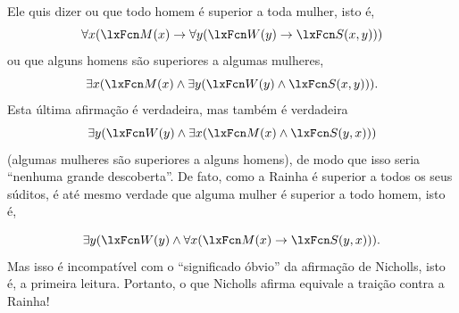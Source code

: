 Ele quis dizer ou que todo homem é superior a toda mulher, isto é,
\[
\forall x(\atom{M}{x} \eif \forall y(\atom{W}{y} \eif \atom{S}{x,y}))
\]
ou que alguns homens são superiores a algumas mulheres,
\[
\exists x(\atom{M}{x} \eand \exists y(\atom{W}{y} \eand \atom{S}{x,y})).
\]
Esta última afirmação é verdadeira, mas também é verdadeira
\[
\exists y(\atom{W}{y} \eand \exists x(\atom{M}{x} \eand \atom{S}{y,x}))
\]
(algumas mulheres são superiores a alguns homens), de modo que isso seria \textquotedblleft nenhuma grande descoberta\textquotedblright{}. De fato, como a Rainha é superior a todos os seus súditos, é até mesmo verdade que alguma mulher é superior a todo homem, isto é,



\[
\exists y(\atom{W}{y} \land \forall x(\atom{M}{x} \eif \atom{S}{y,x})).
\]
Mas isso é incompatível com o \textquotedblleft significado óbvio\textquotedblright{} da afirmação de Nicholls, isto é, a primeira leitura. Portanto, o que Nicholls afirma equivale a traição contra a Rainha!



